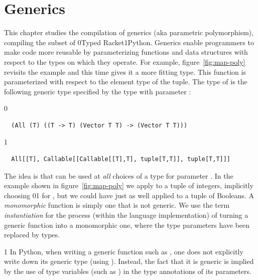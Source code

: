 \documentclass[7x10]{TimesAPriori_MIT}%
\def\racketEd{0}
\def\pythonEd{1}
\def\edition{1}
\newcommand{\racket}[1]{{\if\edition\racketEd{#1}\fi}}
\newcommand{\pythonColor}[0]{}
\newcommand{\python}[1]{{\if\edition\pythonEd\pythonColor #1\fi}}
\numberwithin{theorem}{chapter}
\numberwithin{definition}{chapter}
\numberwithin{equation}{chapter}
\begin{document}

\chapter{Generics}
\label{ch:Lpoly}
\setcounter{footnote}{0}

This chapter studies the compilation of
generics (aka parametric
polymorphism), compiling the
\LangPoly{} subset of \racket{Typed Racket}\python{Python}.  Generics
enable programmers to make code more reusable by parameterizing
functions and data structures with respect to the types on which they
operate. For example, figure~\ref{fig:map-poly} revisits the
 example and this time gives it a more fitting type.  This
 function is parameterized with respect to the element type
of the tuple. The type of  is the following generic type
specified by the  type with parameter :
{\if\edition\racketEd
\begin{lstlisting}
  (All (T) ((T -> T) (Vector T T) -> (Vector T T)))
\end{lstlisting}
\fi}
{\if\edition\pythonEd\pythonColor
\begin{lstlisting}
  All[[T], Callable[[Callable[[T],T], tuple[T,T]], tuple[T,T]]]
\end{lstlisting}
\fi}
%
The idea is that  can be used at \emph{all} choices of a
type for parameter . In the example shown in
figure~\ref{fig:map-poly} we apply  to a tuple of integers,
implicitly choosing \racket{}\python{} for
, but we could have just as well applied  to a tuple
of Booleans.
%
A \emph{monomorphic} function is simply one that is not generic.
%
We use the term \emph{instantiation} for the process (within the
language implementation) of turning a generic function into a
monomorphic one, where the type parameters have been replaced by
types.

{\if\edition\pythonEd\pythonColor
%
In Python, when writing a generic function such as , one
does not explicitly write down its generic type (using ).
Instead, the fact that it is generic is implied by the use of type
variables (such as ) in the type annotations of its
parameters.
%
\fi}
\end{document}
